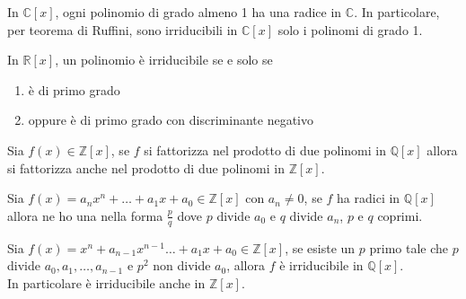 \begin{teorema}
	In $\mathbb{C}[x]$, ogni polinomio di grado almeno 1 ha una radice in $\mathbb{C}$. In particolare, per teorema di Ruffini, sono irriducibili in $\mathbb{C}[x]$ solo i polinomi di grado 1.
\end{teorema}
\begin{teorema}
	In $\mathbb{R}[x]$, un polinomio è irriducibile se e solo se
	\begin{enumerate}
		\item è di primo grado
		\item oppure è di primo grado con discriminante negativo
	\end{enumerate}
\end{teorema}
\begin{teorema}[di Gauss]
	Sia $f(x)\in\mathbb{Z}[x]$, se $f$ si fattorizza nel prodotto di due polinomi in $\mathbb{Q}[x]$ allora si fattorizza anche nel prodotto di due polinomi in $\mathbb{Z}[x]$.
\end{teorema}
\begin{teorema}
	Sia $f(x)=a_nx^n+\dots+a_1x+a_0\in\mathbb{Z}[x]$ con $a_n\neq0$, se $f$ ha radici in $\mathbb{Q}[x]$ allora ne ho una nella forma $\frac{p}{q}$ dove $p$ divide $a_0$ e $q$ divide $a_n$, $p$ e $q$ coprimi.
\end{teorema}
\begin{teorema}
	Sia $f(x)= x^n+ a_{n-1}x^{n-1}\dots+a_1x+a_0\in\mathbb{Z}[x]$, se esiste un $p$ primo tale che $p$ divide $a_0,a_1,\dots,a_{n-1}$ e $p^2$ non divide $a_0$, allora $f$ è irriducibile in $\mathbb{Q}[x]$. \\ In particolare è irriducibile anche in $\mathbb{Z}[x]$.
\end{teorema}
